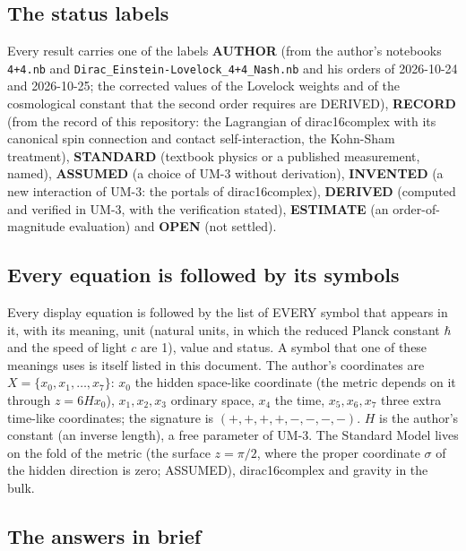 \documentclass[
  10pt,
]{article}
\begin{document}
\hypertarget{the-status-labels}{%
\subsection{The status labels}\label{the-status-labels}}

Every result carries one of the labels \textbf{AUTHOR} (from the
author's notebooks \texttt{4+4.nb} and
\texttt{Dirac\_Einstein-Lovelock\_4+4\_Nash.nb} and his orders of
2026-10-24 and 2026-10-25; the corrected values of the Lovelock weights
and of the cosmological constant that the second order requires are
DERIVED), \textbf{RECORD} (from the record of this repository: the
Lagrangian of dirac16complex with its canonical spin connection and
contact self-interaction, the Kohn-Sham treatment), \textbf{STANDARD}
(textbook physics or a published measurement, named), \textbf{ASSUMED}
(a choice of UM-3 without derivation), \textbf{INVENTED} (a new
interaction of UM-3: the portals of dirac16complex), \textbf{DERIVED}
(computed and verified in UM-3, with the verification stated),
\textbf{ESTIMATE} (an order-of-magnitude evaluation) and \textbf{OPEN}
(not settled).

\hypertarget{every-equation-is-followed-by-its-symbols}{%
\subsection{Every equation is followed by its
symbols}\label{every-equation-is-followed-by-its-symbols}}

Every display equation is followed by the list of EVERY symbol that
appears in it, with its meaning, unit (natural units, in which the
reduced Planck constant \(\hbar\) and the speed of light \(c\) are 1),
value and status. A symbol that one of these meanings uses is itself
listed in this document. The author's coordinates are
\(X = \{x_0, x_1, \dots, x_7\}\): \(x_0\) the hidden space-like
coordinate (the metric depends on it through \(z = 6Hx_0\)),
\(x_1, x_2, x_3\) ordinary space, \(x_4\) the time, \(x_5, x_6, x_7\)
three extra time-like coordinates; the signature is
\((+,+,+,+,-,-,-,-)\). \(H\) is the author's constant (an inverse
length), a free parameter of UM-3. The Standard Model lives on the fold
of the metric (the surface \(z = \pi/2\), where the proper coordinate
\(\sigma\) of the hidden direction is zero; ASSUMED), dirac16complex and
gravity in the bulk.

\hypertarget{the-answers-in-brief}{%
\subsection{The answers in brief}\label{the-answers-in-brief}}
\end{document}
